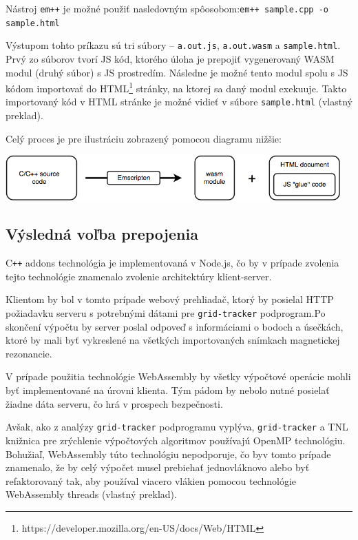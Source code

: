 Nástroj \texttt{em++} je možné použiť nasledovným spôosobom:\newline \texttt{em++ sample.cpp -o sample.html} 

Výstupom tohto príkazu sú tri súbory -- \texttt{a.out.js}, \texttt{a.out.wasm} a \texttt{sample.html}. Prvý zo súborov tvorí JS kód, ktorého úloha je prepojiť vygenerovaný WASM modul (druhý súbor) s JS prostredím. Následne je možné tento modul spolu s JS kódom importovať do HTML\footnote{https://developer.mozilla.org/en-US/docs/Web/HTML} stránky, na ktorej sa daný modul exekuuje. Takto importovaný kód v HTML stránke je možné vidieť v súbore \texttt{sample.html} \cite{cpp_to_wasm} (vlastný preklad).

Celý proces je pre ilustráciu zobrazený pomocou diagramu nižšie:
\begin {center}
        \centering
        \includegraphics[height=1.75cm]{media/graphs/cpp_to_wasm.png}
        \captionsetup{justification=centering}
\end {center}

\subsection {Výsledná voľba prepojenia}
C\texttt{++} addons technológia je implementovaná v Node.js, čo by v prípade zvolenia tejto technológie znamenalo zvolenie architektúry klient-server.

Klientom by bol v tomto prípade webový prehliadač, ktorý by posielal HTTP požiadavku serveru s potrebnými dátami pre \texttt{grid-tracker} podprogram.\newline Po skončení výpočtu by server poslal odpoveď s informáciami o bodoch a úsečkách, ktoré by mali byť vykreslené na všetkých importovaných snímkach magnetickej rezonancie.

V prípade použitia technológie WebAssembly by všetky výpočtové operácie mohli byť implementované na úrovni klienta. Tým pádom by nebolo nutné posielať žiadne dáta serveru, čo hrá v prospech bezpečnosti.

Avšak, ako z analýzy \texttt{grid-tracker} podprogramu vyplýva, \texttt{grid-tracker} a TNL knižnica pre zrýchlenie výpočtových algoritmov používajú OpenMP technológiu. Bohužiaľ, WebAssembly túto technológiu nepodporuje, čo by\newline v tomto prípade znamenalo, že by celý výpočet musel prebiehať jednovláknovo alebo byť refaktorovaný tak, aby používal viacero vlákien pomocou technológie WebAssembly threads \cite{webassembly_threads} (vlastný preklad).

